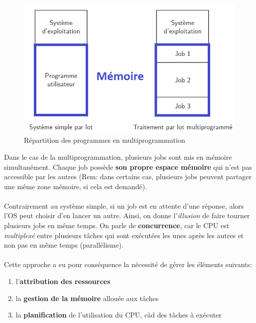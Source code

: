 \item{}
{
\begin{figure}[h!]
\center\includegraphics[scale=.4]{images/multiprogrammation}
\caption{Répartition des programmes en multiprogrammation \cite{ref1}}
\end{figure}

Dans le cas de la multiprogrammation, plusieurs jobs sont mis en mémoire simultanément. Chaque job possède \textbf{son propre espace mémoire} qui n'est pas accessible par les autres (Rem: dans certains cas, plusieurs jobs peuvent partager une même zone mémoire, si cela est demandé).
\paragraph{}
Contrairement au système simple, si un job est en attente d'une réponse, alors l'OS peut choisir d'en lancer un autre. Ainsi, on donne l'\textit{illusion} de faire tourner plusieurs jobs en même temps. On parle de \textbf{concurrence}, car le CPU est \textit{multiplexé} entre plusieurs tâches qui sont exécutées les unes après les autres et non pas en même temps (parallélisme).

\paragraph{}
Cette approche a eu pour conséquence la nécessité de gérer les éléments suivants:
\begin{enumerate}
\item l'\textbf{attribution des ressources}
\item la \textbf{gestion de la mémoire} allouée aux tâches
\item la \textbf{planification} de l'utilisation du CPU, càd des tâches à exécuter
\end{enumerate}

}
